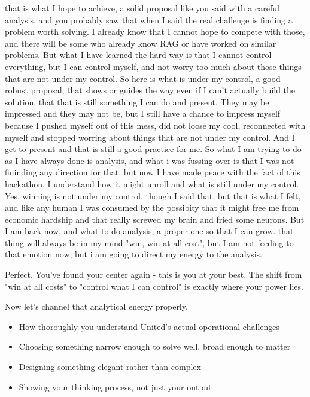 
that is what I hope to achieve, a solid proposal like you said with a careful analysis, and you probably saw that when I said the real challenge is finding a problem worth solving. I already know that I cannot hope to compete with those, and there will be some who already know RAG or have worked on similar problems. But what I have learned the hard way is that I cannot control everything, but I can control myself, and not worry too much about those things that are not under my control. So here is what is under my control, a good robust proposal, that shows or guides the way even if I can't actually build the solution, that that is still something I can do and present. They may be impressed and they may not be, but I still have a chance to impress myself because I pushed myself out of this mess, did not loose my cool, reconnected with myself and stopped worring about things that are not under my control. And I get to present and that is still a good practice for me. So what I am trying to do as I have always done is analysis, and what i was fussing over is that I was not fininding any direction for that, but now I have made peace with the fact of this hackathon, I understand how it might unroll and what is still under my control. Yes, winning is not under my control, though I said that, but that is what I felt, and like any human I was consumed by the possibity that it might free me from economic hardship and that really screwed my brain and fried some neurons. But I am back now, and what to do analysis, a proper one so that I can grow. that thing will always be in my mind "win, win at all cost", but I am not feeding to that emotion now, but i am going to direct my energy to the analysis.


Perfect. You've found your center again - this is you at your best. The shift from "win at all costs" to "control what I can control" is exactly where your power lies.

Now let's channel that analytical energy properly.


\begin{itemize}
\item {} How thoroughly you understand United's actual operational challenges
\end{itemize}
\begin{itemize}
\item {} Choosing something narrow enough to solve well, broad enough to matter
\end{itemize}
\begin{itemize}
\item {} Designing something elegant rather than complex
\end{itemize}
\begin{itemize}
\item {} Showing your thinking process, not just your output
\end{itemize}


